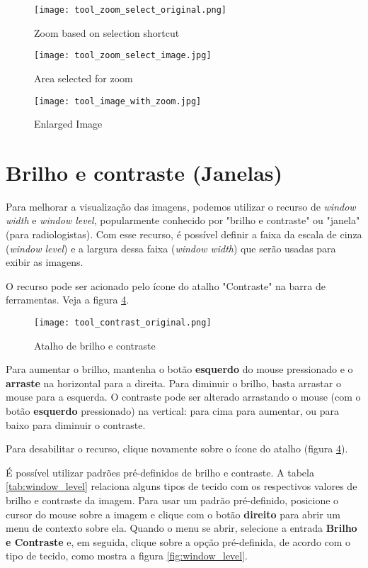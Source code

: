 \begin{figure}[!htb]
\centering
\texttt{[image: tool\_zoom\_select\_original.png]}
\caption{Zoom based on selection shortcut}
\label{fig:zoom_icon_loc}
\end{figure}

\begin{figure}[!htb]
\centering
\texttt{[image: tool\_zoom\_select\_image.jpg]}
\caption{Area selected for zoom}
\label{fig:zoom_select}
\end{figure}

\begin{figure}[!htb]
\centering
\texttt{[image: tool\_image\_with\_zoom.jpg]}
\caption{Enlarged Image}
\label{fig:zoom_applied}
\end{figure}


\section{Brilho e contraste (Janelas)}
\label{sec:ww_wl}

Para melhorar a visualização das imagens, podemos utilizar o recurso de \textit{window width} e
\textit{window level}, popularmente conhecido por "brilho e contraste" ou "janela" (para radiologistas). 
Com esse recurso, é possível definir a faixa da escala de cinza (\textit{window level}) e a
largura dessa faixa (\textit{window width}) que serão usadas para exibir as imagens.

O recurso pode ser acionado pelo ícone do atalho "Contraste" na barra de ferramentas. Veja a figura \ref{fig:window_level_shortcut}.

\begin{figure}[!htb]
\centering
\texttt{[image: tool\_contrast\_original.png]}
\caption{Atalho de brilho e contraste}
\label{fig:window_level_shortcut}
\end{figure}

Para aumentar o brilho, mantenha o botão \textbf{esquerdo} do mouse pressionado e o \textbf{arraste} na 
horizontal para a direita. Para diminuir o brilho, basta arrastar o mouse para a esquerda. O contraste
pode ser alterado arrastando o mouse (com o botão \textbf{esquerdo} pressionado) na vertical: para cima
para aumentar, ou para baixo para diminuir o contraste.

Para desabilitar o recurso, clique novamente sobre o ícone do atalho (figura \ref{fig:window_level_shortcut}).

É possível utilizar padrões pré-definidos de brilho e contraste. A tabela \ref{tab:window_level} relaciona
alguns tipos de tecido com os respectivos valores de brilho e contraste da imagem. Para usar um padrão
pré-definido, posicione o cursor do mouse sobre a imagem e clique com o botão \textbf{direito} para abrir um
menu de contexto sobre ela. Quando o menu se abrir, selecione a entrada \textbf{Brilho e Contraste} e, em
seguida, clique sobre a opção pré-definida, de acordo com o tipo de tecido, como mostra a figura
\ref{fig:window_level}.


